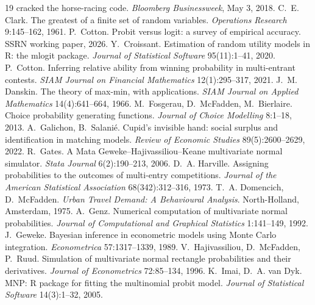 \documentclass[11pt]{article}
\begin{document}
\begin{thebibliography}{19}
cracked the horse-racing code. \emph{Bloomberg Businessweek}, May 3,
2018.
 C.~E. Clark.
The greatest of a finite set of random variables.
\emph{Operations Research} 9:145--162, 1961.
 P.~Cotton. Probit versus logit:
a survey of empirical accuracy. SSRN working paper, 2026.
 Y.~Croissant.
Estimation of random utility models in R: the mlogit package.
\emph{Journal of Statistical Software} 95(11):1--41, 2020.
 P.~Cotton.
Inferring relative ability from winning probability in multi-entrant contests.
\emph{SIAM Journal on Financial Mathematics} 12(1):295--317, 2021.
 J.~M. Danskin. The theory of
max-min, with applications. \emph{SIAM Journal on Applied Mathematics}
14(4):641--664, 1966.
M.~Fosgerau, D.~McFadden, M.~Bierlaire. Choice probability generating
functions. \emph{Journal of Choice Modelling} 8:1--18, 2013.
 A.~Galichon,
B.~Salani\'e. Cupid's invisible hand: social surplus and identification in
matching models. \emph{Review of Economic Studies} 89(5):2600--2629, 2022.
 R.~Gates.
A Mata Geweke--Hajivassiliou--Keane multivariate normal simulator.
\emph{Stata Journal} 6(2):190--213, 2006.
 D.~A. Harville. Assigning
probabilities to the outcomes of multi-entry competitions.
\emph{Journal of the American Statistical Association}
68(342):312--316, 1973.
 T.~A. Domencich,
D.~McFadden. \emph{Urban Travel Demand: A Behavioural Analysis}.
North-Holland, Amsterdam, 1975.
 A.~Genz.
Numerical computation of multivariate normal probabilities.
\emph{Journal of Computational and Graphical Statistics} 1:141--149, 1992.
 J.~Geweke.
Bayesian inference in econometric models using Monte Carlo integration.
\emph{Econometrica} 57:1317--1339, 1989.
 V.~Hajivassiliou,
D.~McFadden, P.~Ruud. Simulation of multivariate normal rectangle probabilities
and their derivatives. \emph{Journal of Econometrics} 72:85--134, 1996.
 K.~Imai, D.~A. van Dyk.
MNP: R package for fitting the multinomial probit model.
\emph{Journal of Statistical Software} 14(3):1--32, 2005.

\end{thebibliography}
\end{document}
